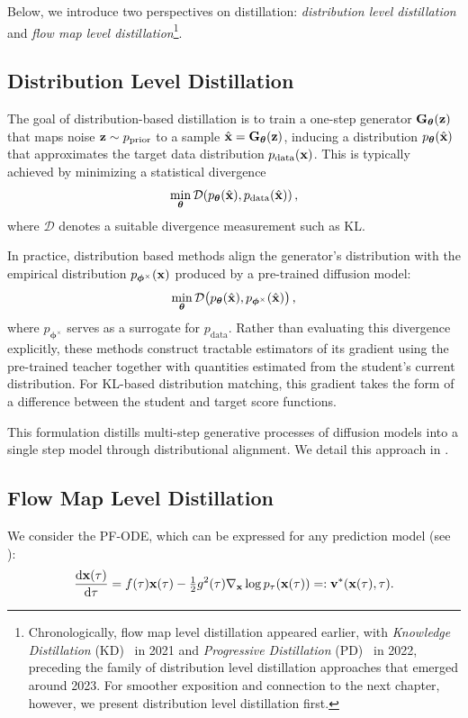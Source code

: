 Below, we introduce two perspectives on distillation: \emph{distribution level distillation} and \emph{flow map level distillation}\footnote{Chronologically, flow map level distillation appeared earlier, with \emph{Knowledge Distillation} (KD)~\citep{luhman2021knowledge} in 2021 and \emph{Progressive Distillation} (PD)~\citep{salimans2021progressive} in 2022, preceding the family of distribution level distillation approaches that emerged around 2023. For smoother exposition and connection to the next chapter, however, we present distribution level distillation first.}.





\subsection{Distribution Level Distillation}  
The goal of distribution-based distillation is to train a one-step generator ${\mathbf{G}}_{\bm{\theta}}({\mathbf{z}})$ that maps noise ${\mathbf{z}} \sim p_{\mathrm{prior}}$ to a sample $\hat{{\mathbf{x}}} = {\mathbf{G}}_{\bm{\theta}}({\mathbf{z}})$, inducing a distribution $p_{\bm{\theta}}(\hat{{\mathbf{x}}})$ that approximates the target data distribution $p_{\mathrm{data}}({\mathbf{x}})$. This is typically achieved by minimizing a statistical divergence
\[
\min_{\bm{\theta}}  \mathcal{D}\!\left(p_{\bm{\theta}}(\hat{{\mathbf{x}}}),  p_{\mathrm{data}}(\hat{{\mathbf{x}}})\right),
\]
where $\mathcal{D}$ denotes a suitable divergence measurement such as KL.  

In practice, distribution based methods align the generator’s distribution with the empirical distribution $p_{\bm{\phi}^\times}({\mathbf{x}})$ produced by a pre-trained diffusion model:
\[
\min_{\bm{\theta}}  \mathcal{D}\!\left(p_{\bm{\theta}}(\hat{{\mathbf{x}}}),  p_{\bm{\phi}^\times}(\hat{{\mathbf{x}}})\right),
\]
where $p_{\bm{\phi}^\times}$ serves as a surrogate for $p_{\mathrm{data}}$. Rather than evaluating this divergence explicitly, these methods construct tractable estimators of its gradient using the pre-trained teacher together with quantities estimated from the student's current distribution. For KL-based distribution matching, this gradient takes the form of a difference between the student and target score functions.

This formulation distills multi-step generative processes of diffusion models into a single step model through distributional alignment. We detail this approach in .




\subsection{Flow Map Level Distillation} We consider the PF-ODE, which can be expressed for any prediction model (see ):
\begin{align}\label{eq:pf-ode-ct}
    \frac{\mathop{}\!\mathrm{d} {\mathbf{x}}(\tau)}{\mathop{}\!\mathrm{d} \tau} 
    = f(\tau) {\mathbf{x}}(\tau) - \tfrac{1}{2}g^2(\tau) \nabla_{\mathbf{x}} \log p_\tau({\mathbf{x}}(\tau)) 
    =: {\mathbf{v}}^*({\mathbf{x}}(\tau), \tau).
\end{align}

